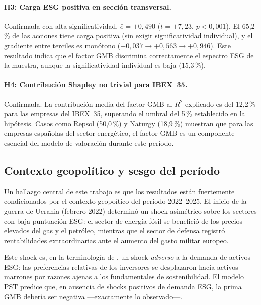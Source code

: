 \documentclass[12pt, a4paper]{article}
\begin{document}
\paragraph{H3: Carga ESG positiva en secci\'on transversal.}
Confirmada con alta significatividad. $\bar{e} = +0{,}490$ ($t = +7{,}23$, $p < 0{,}001$).
El 65{,}2\,\% de las acciones tiene carga positiva (sin exigir significatividad individual),
y el gradiente entre terciles es mon\'otono ($-0{,}037 \to +0{,}563 \to +0{,}946$).
Este resultado indica que el factor GMB discrimina correctamente el espectro ESG
de la muestra, aunque la significatividad individual es baja (15{,}3\,\%).

\paragraph{H4: Contribuci\'on Shapley no trivial para IBEX~35.}
Confirmada. La contribuci\'on media del factor GMB al $R^2$ explicado es del 12{,}2\,\%
para las empresas del IBEX~35, superando el umbral del 5\,\% establecido en la hip\'otesis.
Casos como Repsol (50{,}0\,\%) y Naturgy (18{,}9\,\%) muestran que para las empresas
espa\~nolas del sector energ\'etico, el factor GMB es un componente esencial del modelo
de valoraci\'on durante este per\'iodo.

\subsection{Contexto geopolítico y sesgo del período}
\label{subsec:geopol}

Un hallazgo central de este trabajo es que los resultados est\'an fuertemente
condicionados por el contexto geopo\'itico del per\'iodo 2022--2025. El inicio de la
guerra de Ucrania (febrero 2022) determin\'o un shock asim\'etrico sobre los sectores
con baja puntuaci\'on ESG: el sector de energ\'ia f\'osil se benefici\'o de los precios
elevados del gas y el petr\'oleo, mientras que el sector de defensa registr\'o
rentabilidades extraordinarias ante el aumento del gasto militar europeo.

Este shock es, en la terminolog\'ia de \textcites{pastor2021}{pastor2022}, un shock
\textit{adverso} a la demanda de activos ESG: las preferencias relativas de los
inversores se desplazaron hacia activos marrones por razones ajenas a los fundamentales
de sostenibilidad. El modelo PST predice que, en ausencia de shocks positivos de
demanda ESG, la prima GMB deber\'ia ser negativa ---exactamente lo observado---.
\end{document}
